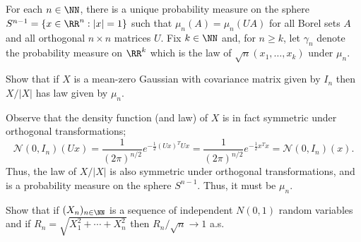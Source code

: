 \documentclass[11pt, headheight=30pt]{scrartcl}
\begin{document}
\section{}
\begin{prob}
    For each $n \in \NN$, there is a unique probability measure on the sphere $S^{n-1} = \{x \in \RR^n : |x| = 1\}$
    such that $\mu_n(A) = \mu_n(UA)$ for all Borel sets $A$ and all orthogonal $n \times n$ matrices $U$.
    Fix $k \in \NN$ and, for $n \geq k$, let $\gamma_n$ denote the probability measure on $\RR^k$
    which is the law of $\sqrt{n} (x_1, \ldots, x_k)$ under $\mu_n$.
    
    Show that if $X$ is a mean-zero Gaussian with covariance matrix given by $I_n$ then $X/|X|$ has law given by $\mu_n$.
\end{prob}

Observe that the density function (and law) of $X$ is in fact symmetric
under orthogonal transformations;
\[
    \mathcal{N}(0, I_n)(Ux) = \frac{1}{(2\pi)^{n/2}} e^{-\frac{1}{2} (Ux)^T Ux} = \frac{1}{(2\pi)^{n/2}} e^{-\frac{1}{2} x^T x} = \mathcal{N}(0, I_n)(x).
\]
Thus, the law of $X/|X|$ is also symmetric under orthogonal transformations,
and is a probability measure on the sphere $S^{n-1}$. Thus, it must be $\mu_n$.

\begin{prob}
    Show that if $(X_n)_{n \in \NN}$ is a sequence of independent $N(0, 1)$ random variables and if $R_n = \sqrt{X_1^2 + \cdots + X_n^2}$
    then $R_n/\sqrt{n} \to 1$ a.s.
\end{prob}
\end{document}
